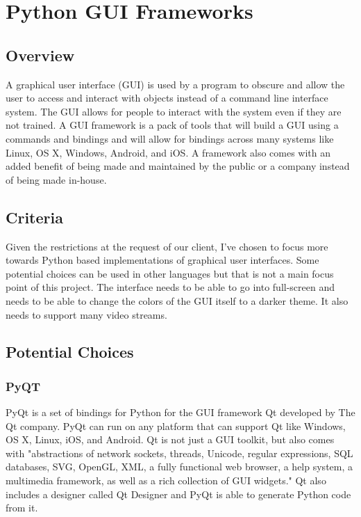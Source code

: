 \documentclass[onecolumn, draftclsnofoot, 10pt, compsoc]{IEEEtran}
\begin{document}
\section{Python GUI Frameworks}
\subsection{Overview}
A graphical user interface (GUI) is used by a program to obscure and allow the user to access and interact with objects instead of a command line interface system.
The GUI allows for people to interact with the system even if they are not trained.
A GUI framework is a pack of tools that will build a GUI using a commands and bindings and will allow for bindings across many systems like Linux, OS X, Windows, Android, and iOS.
A framework also comes with an added benefit of being made and maintained by the public or a company instead of being made in-house.

\subsection{Criteria}
Given the restrictions at the request of our client, I've chosen to focus more towards Python based implementations of graphical user interfaces. 
Some potential choices can be used in other languages but that is not a main focus point of this project.
The interface needs to be able to go into full-screen and needs to be able to change the colors of the GUI itself to a darker theme.
It also needs to support many video streams.

\subsection{Potential Choices}
\subsubsection{PyQT}
PyQt is a set of bindings for Python for the GUI framework Qt developed by The Qt company. \cite{PyQt}
PyQt can run on any platform that can support Qt like Windows, OS X, Linux, iOS, and Android.
Qt is not just a GUI toolkit, but also comes with "abstractions of network sockets, threads, Unicode, regular expressions, SQL databases, SVG, OpenGL, XML, a fully functional web browser, a help system, a multimedia framework, as well as a rich collection of GUI widgets." \cite{PyQt}
Qt also includes a designer called Qt Designer and PyQt is able to generate Python code from it.
\end{document}
